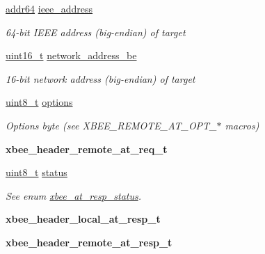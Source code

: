 \begin{DoxyCompactItemize}
\item 
\hyperlink{unionaddr64}{addr64} \hyperlink{group__xbee__atcmd_ga2549f921e25a72dfa05a2154a792e2bf}{ieee\-\_\-address}
\begin{DoxyCompactList}\small\item\em 64-\/bit I\-E\-E\-E address (big-\/endian) of target \end{DoxyCompactList}\item 
\hyperlink{group__hal_ga5a8b2dc9e45a9ee81a94ef304fb62505}{uint16\-\_\-t} \hyperlink{group__xbee__atcmd_ga73d48563eb05cd5fcc4add79d226a3b8}{network\-\_\-address\-\_\-be}
\begin{DoxyCompactList}\small\item\em 16-\/bit network address (big-\/endian) of target \end{DoxyCompactList}\item 
\hyperlink{group__hal_gae1affc9ca37cfb624959c866a73f83c2}{uint8\-\_\-t} \hyperlink{group__xbee__atcmd_gaace3d640c8d449b8db1162993d259d3f}{options}
\begin{DoxyCompactList}\small\item\em Options byte (see X\-B\-E\-E\-\_\-\-R\-E\-M\-O\-T\-E\-\_\-\-A\-T\-\_\-\-O\-P\-T\-\_\-$\ast$ macros) \end{DoxyCompactList}\item 
\hypertarget{group__xbee__atcmd_gac183f43dbcf4b089132cd4c5f1677d62}{{\bfseries xbee\-\_\-header\-\_\-remote\-\_\-at\-\_\-req\-\_\-t}}\label{group__xbee__atcmd_gac183f43dbcf4b089132cd4c5f1677d62}

\item 
\hyperlink{group__hal_gae1affc9ca37cfb624959c866a73f83c2}{uint8\-\_\-t} \hyperlink{group__xbee__atcmd_gade818037fd6c985038ff29656089758d}{status}
\begin{DoxyCompactList}\small\item\em See enum \hyperlink{group__xbee__atcmd_gac6a27f1b1ee32b75b6f966afbb347f22}{xbee\-\_\-at\-\_\-resp\-\_\-status}. \end{DoxyCompactList}\item 
\hypertarget{group__xbee__atcmd_gadee54f5443232dd369d7f30cea874c69}{{\bfseries xbee\-\_\-header\-\_\-local\-\_\-at\-\_\-resp\-\_\-t}}\label{group__xbee__atcmd_gadee54f5443232dd369d7f30cea874c69}

\item 
\hypertarget{group__xbee__atcmd_gaa69f16913b7efb4fafc34dbdccf198cd}{{\bfseries xbee\-\_\-header\-\_\-remote\-\_\-at\-\_\-resp\-\_\-t}}\label{group__xbee__atcmd_gaa69f16913b7efb4fafc34dbdccf198cd}


\end{DoxyCompactItemize}
